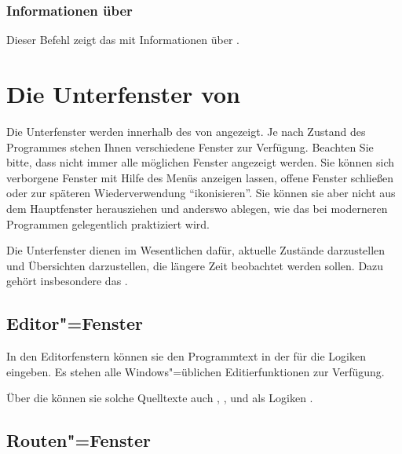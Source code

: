 \subsection{Informationen über \mutabor}
\label{sec:MI_ABOUT}

Dieser Befehl zeigt das  mit Informationen 
über \mutabor{}.

\chapter{Die Unterfenster von \mutabor}\label{sec:DE_SUBWINDOW}

Die Unterfenster werden innerhalb des
 von \mutabor{}
angezeigt. Je nach Zustand des Programmes stehen Ihnen verschiedene
Fenster zur Verfügung. Beachten Sie bitte, dass nicht immer alle
möglichen Fenster angezeigt werden. Sie können sich verborgene Fenster
mit Hilfe des Menüs  anzeigen lassen, offene
Fenster schließen oder zur späteren Wiederverwendung
"`ikonisieren"'. Sie können sie aber nicht aus dem Hauptfenster
herausziehen und anderswo ablegen, wie das bei moderneren Programmen
gelegentlich praktiziert wird.

Die Unterfenster dienen im Wesentlichen dafür, aktuelle Zustände
darzustellen und Übersichten darzustellen, die längere Zeit beobachtet
werden sollen. Dazu gehört insbesondere das
.


\section{Editor"=Fenster}\label{sec:DE_EDIT}
In den Editorfenstern können sie den Programmtext in der
 für die Logiken eingeben.
Es stehen alle Windows"=üblichen Editierfunktionen zur Verfügung.

Über die  können sie solche
Quelltexte auch ,
,
 und als Logiken
.


\section{Routen"=Fenster}\label{sec:DE_ROUTES}
\label{sec:de_routes}

